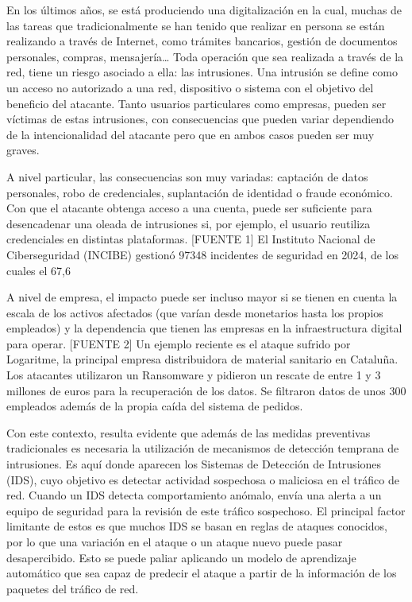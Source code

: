 En los últimos años, se está produciendo una digitalización en la cual, muchas de las tareas que tradicionalmente se han tenido que realizar en persona se están realizando a través de Internet, como trámites bancarios, gestión de documentos personales, compras, mensajería… Toda operación que sea realizada a través de la red, tiene un riesgo asociado a ella: las intrusiones. Una intrusión se define como un acceso no autorizado a una red, dispositivo o sistema con el objetivo del beneficio del atacante. Tanto usuarios particulares como empresas, pueden ser víctimas de estas intrusiones, con consecuencias que pueden variar dependiendo de la intencionalidad del atacante pero que en ambos casos pueden ser muy graves.

A nivel particular, las consecuencias son muy variadas: captación de datos personales, robo de credenciales, suplantación de identidad o fraude económico. Con que el atacante obtenga acceso a una cuenta, puede ser suficiente para desencadenar una oleada de intrusiones si, por ejemplo, el usuario reutiliza credenciales en distintas plataformas. [FUENTE 1] El Instituto Nacional de Ciberseguridad (INCIBE) gestionó 97348 incidentes de seguridad en 2024, de los cuales el 67,6%

A nivel de empresa, el impacto puede ser incluso mayor si se tienen en cuenta la escala de los activos afectados (que varían desde monetarios hasta los propios empleados) y la dependencia que tienen las empresas en la infraestructura digital para operar.  [FUENTE 2] Un ejemplo reciente es el ataque sufrido por Logaritme, la principal empresa distribuidora de material sanitario en Cataluña. Los atacantes utilizaron un Ransomware y pidieron un rescate de entre 1 y 3 millones de euros para la recuperación de los datos. Se filtraron datos de unos 300 empleados además de la propia caída del sistema de pedidos.

Con este contexto, resulta evidente que además de las medidas preventivas tradicionales es necesaria la utilización de mecanismos de detección temprana de intrusiones. Es aquí donde aparecen los Sistemas de Detección de Intrusiones (IDS), cuyo objetivo es detectar actividad sospechosa o maliciosa en el tráfico de red. Cuando un IDS detecta comportamiento anómalo, envía una alerta a un equipo de seguridad para la revisión de este tráfico sospechoso. El principal factor limitante de estos es que muchos IDS se basan en reglas de ataques conocidos, por lo que una variación en el ataque o un ataque nuevo puede pasar desapercibido. Esto se puede paliar aplicando un modelo de aprendizaje automático que sea capaz de predecir el ataque a partir de la información de los paquetes del tráfico de red.

